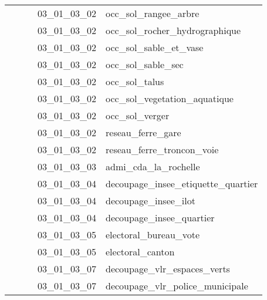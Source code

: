 \documentclass[12pt,titlepage]{book}
\begin{document}
\begin{supertabular}{|p{7.5cm}|p{7.5cm}|p{7.5cm}|c|p{10cm}|}
                   &                    &                    & 03\_01\_03\_02 & occ\_sol\_rangee\_arbre\\
                   &                    &                    & 03\_01\_03\_02 & occ\_sol\_rocher\_hydrographique\\
                   &                    &                    & 03\_01\_03\_02 & occ\_sol\_sable\_et\_vase\\
                   &                    &                    & 03\_01\_03\_02 & occ\_sol\_sable\_sec\\
                   &                    &                    & 03\_01\_03\_02 & occ\_sol\_talus\\
                   &                    &                    & 03\_01\_03\_02 & occ\_sol\_vegetation\_aquatique\\
                   &                    &                    & 03\_01\_03\_02 & occ\_sol\_verger\\
                   &                    &                    & 03\_01\_03\_02 & reseau\_ferre\_gare\\
                   &                    &                    & 03\_01\_03\_02 & reseau\_ferre\_troncon\_voie\\
                   &                    &                    & 03\_01\_03\_03 & admi\_cda\_la\_rochelle\\
                   &                    &                    & 03\_01\_03\_04 & decoupage\_insee\_etiquette\_quartier\\
                   &                    &                    & 03\_01\_03\_04 & decoupage\_insee\_ilot\\
                   &                    &                    & 03\_01\_03\_04 & decoupage\_insee\_quartier\\
                   &                    &                    & 03\_01\_03\_05 & electoral\_bureau\_vote\\
                   &                    &                    & 03\_01\_03\_05 & electoral\_canton\\
                   &                    &                    & 03\_01\_03\_07 & decoupage\_vlr\_espaces\_verts\\
                   &                    &                    & 03\_01\_03\_07 & decoupage\_vlr\_police\_municipale\\

\end{supertabular}
\end{document}
